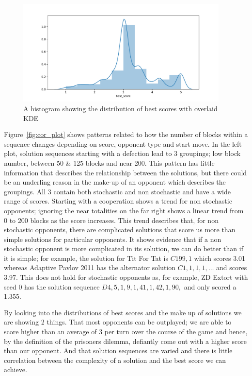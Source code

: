 \begin{figure}[ht]
    \includegraphics[width=0.95\textwidth, center]{./img/descriptive/best_score_hist.pdf}
    \caption{A histogram showing the distribution of best scores with overlaid KDE}\label{fig:best_score_hist}
\end{figure}

Figure~\ref{fig:cor_plot} shows patterns related to how the number of blocks within a sequence changes depending on score, opponent type and start move.
In the left plot, solution sequences starting with a defection lead to 3 groupings; low block number, between 50 \& 125 blocks and near 200.
This pattern has little information that describes the relationship between the solutions, but there could be an underling reason in the make-up of an opponent which describes the groupings.
All 3 contain both stochastic and non stochastic and have a wide range of scores.
Starting with a cooperation shows a trend for non stochastic opponents; ignoring the near totalities on the far right shows a linear trend from 0 to 200 blocks as the score increases.
This trend describes that, for non stochastic opponents, there are complicated solutions that score us more than simple solutions for particular opponents.
It shows evidence that if a non stochastic opponent is more complicated in its solution, we can do better than if it is simple; for example, the solution for Tit For Tat is $C199,1$ which scores 3.01 whereas Adaptive Pavlov 2011 has the alternator solution $C1,1,1,1,\ldots$ and scores 3.97.
This does not hold for stochastic opponents as, for example, ZD Extort with seed 0 has the solution sequence $D4,5,1,9,1,41,1,42,1,90,$ and only scored a 1.355.

By looking into the distributions of best scores and the make up of solutions we are showing 2 things.
That most opponents can be outplayed; we are able to score higher than an average of 3 per turn over the course of the game and hence, by the definition of the prisoners dilemma, defiantly come out with a higher score than our opponent.
And that solution sequences are varied and there is little correlation between the complexity of a solution and the best score we can achieve. 

